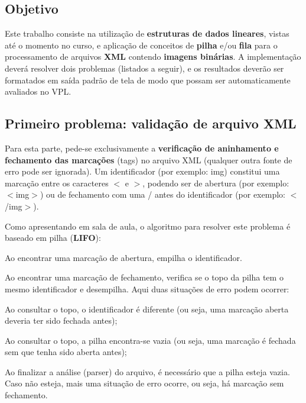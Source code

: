 \subsection*{Objetivo}

Este trabalho consiste na utilização de {\bfseries{estruturas de dados lineares}}, vistas até o momento no curso, e aplicação de conceitos de {\bfseries{pilha}} e/ou {\bfseries{fila}} para o processamento de arquivos {\bfseries{X\+ML}} contendo {\bfseries{imagens binárias}}. A implementação deverá resolver dois problemas (listados a seguir), e os resultados deverão ser formatados em saída padrão de tela de modo que possam ser automaticamente avaliados no V\+PL.

\subsection*{Primeiro problema\+: validação de arquivo X\+ML}

Para esta parte, pede-\/se exclusivamente a {\bfseries{verificação de aninhamento e fechamento das marcações}} (tags) no arquivo X\+ML (qualquer outra fonte de erro pode ser ignorada). Um identificador (por exemplo\+: {\ttfamily img}) constitui uma marcação entre os caracteres {\ttfamily $<$} e {\ttfamily $>$}, podendo ser de abertura (por exemplo\+: {\ttfamily $<$img$>$}) ou de fechamento com uma {\ttfamily /} antes do identificador (por exemplo\+: {\ttfamily $<$/img$>$}).

Como apresentando em sala de aula, o algoritmo para resolver este problema é baseado em pilha ({\bfseries{L\+I\+FO}})\+:
\begin{DoxyItemize}
\item Ao encontrar uma marcação de abertura, empilha o identificador.
\item Ao encontrar uma marcação de fechamento, verifica se o topo da pilha tem o mesmo identificador e desempilha. Aqui duas situações de erro podem ocorrer\+:
\begin{DoxyItemize}
\item Ao consultar o topo, o identificador é diferente (ou seja, uma marcação aberta deveria ter sido fechada antes);
\item Ao consultar o topo, a pilha encontra-\/se vazia (ou seja, uma marcação é fechada sem que tenha sido aberta antes);
\end{DoxyItemize}
\item Ao finalizar a análise (parser) do arquivo, é necessário que a pilha esteja vazia. Caso não esteja, mais uma situação de erro ocorre, ou seja, há marcação sem fechamento.
\end{DoxyItemize}

